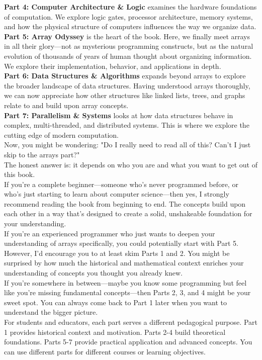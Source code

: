 \documentclass[12pt, oneside, openany]{book}
\begin{document}
\textbf{Part 4: Computer Architecture \& Logic} examines the hardware foundations of computation. We explore logic gates, processor architecture, memory systems, and how the physical structure of computers influences the way we organize data.\\
\textbf{Part 5: Array Odyssey} is the heart of the book. Here, we finally meet arrays in all their glory—not as mysterious programming constructs, but as the natural evolution of thousands of years of human thought about organizing information. We explore their implementation, behavior, and applications in depth.\\
\textbf{Part 6: Data Structures \& Algorithms} expands beyond arrays to explore the broader landscape of data structures. Having understood arrays thoroughly, we can now appreciate how other structures like linked lists, trees, and graphs relate to and build upon array concepts.\\
\textbf{Part 7: Parallelism \& Systems} looks at how data structures behave in complex, multi-threaded, and distributed systems. This is where we explore the cutting edge of modern computation.\\
Now, you might be wondering: "Do I really need to read all of this? Can't I just skip to the arrays part?" \\
The honest answer is: it depends on who you are and what you want to get out of this book.\\
If you're a complete beginner—someone who's never programmed before, or who's just starting to learn about computer science—then yes, I strongly recommend reading the book from beginning to end. The concepts build upon each other in a way that's designed to create a solid, unshakeable foundation for your understanding.\\
If you're an experienced programmer who just wants to deepen your understanding of arrays specifically, you could potentially start with Part 5. However, I'd encourage you to at least skim Parts 1 and 2. You might be surprised by how much the historical and mathematical context enriches your understanding of concepts you thought you already knew.\\
If you're somewhere in between—maybe you know some programming but feel like you're missing fundamental concepts—then Parts 2, 3, and 4 might be your sweet spot. You can always come back to Part 1 later when you want to understand the bigger picture.\\
For students and educators, each part serves a different pedagogical purpose. Part 1 provides historical context and motivation. Parts 2-4 build theoretical foundations. Parts 5-7 provide practical application and advanced concepts. You can use different parts for different courses or learning objectives.\\
\end{document}
